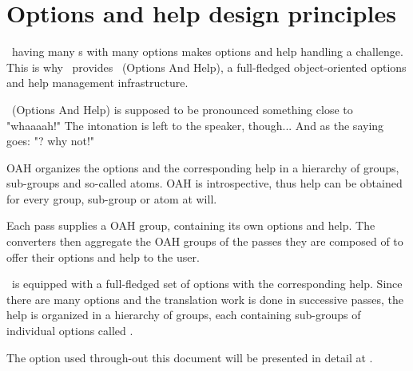 



\chapter{Options and help design principles}

\mf\ having many \service s with many options makes options and help handling a challenge.\\
This is why \mf\ provides \oahRepr\ (Options And Help), a full-fledged object-oriented options and help management infrastructure.

\oahRepr\ (Options And Help) is supposed to be pronounced something close to "whaaaah!"
    The intonation is left to the speaker, though...
    And as the saying goes: "\oahRepr? why not!"

OAH organizes the options and the corresponding help in a hierarchy of groups, sub-groups and so-called atoms. OAH is introspective, thus help can be obtained for every group, sub-group or atom at will.

Each pass supplies a OAH group, containing its own options and help. The converters then aggregate the OAH groups of the passes they are composed of to offer their options and help to the user.

\mf\ is equipped with a full-fledged set of options with the corresponding help. Since there are many options and the translation work is done in successive passes, the help is organized in a hierarchy of groups, each containing sub-groups of individual options called .

The  option used through-out this document will be presented in detail at .


